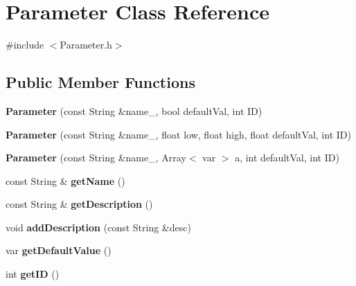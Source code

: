 \hypertarget{classParameter}{\section{Parameter Class Reference}
\label{classParameter}
}


{\ttfamily \#include $<$Parameter.\-h$>$}

\subsection*{Public Member Functions}
\begin{DoxyCompactItemize}
\item 
\hypertarget{classParameter_a21c5d8266e270b1f23295eabbe35d37f}{{\bfseries Parameter} (const String \&name\-\_\-, bool default\-Val, int I\-D)}\label{classParameter_a21c5d8266e270b1f23295eabbe35d37f}

\item 
\hypertarget{classParameter_a2ee8423ed28378b77eff4e69ebe31be1}{{\bfseries Parameter} (const String \&name\-\_\-, float low, float high, float default\-Val, int I\-D)}\label{classParameter_a2ee8423ed28378b77eff4e69ebe31be1}

\item 
\hypertarget{classParameter_a481767bd518c8c75459dc16580b19199}{{\bfseries Parameter} (const String \&name\-\_\-, Array$<$ var $>$ a, int default\-Val, int I\-D)}\label{classParameter_a481767bd518c8c75459dc16580b19199}

\item 
\hypertarget{classParameter_a40dd77acd828bd3f50832548ec3b8cfd}{const String \& {\bfseries get\-Name} ()}\label{classParameter_a40dd77acd828bd3f50832548ec3b8cfd}

\item 
\hypertarget{classParameter_ad2a916413e8cf95f677a5f2e12ddb919}{const String \& {\bfseries get\-Description} ()}\label{classParameter_ad2a916413e8cf95f677a5f2e12ddb919}

\item 
\hypertarget{classParameter_a2e5de29da44e4d0f04a236c862cce2dc}{void {\bfseries add\-Description} (const String \&desc)}\label{classParameter_a2e5de29da44e4d0f04a236c862cce2dc}

\item 
\hypertarget{classParameter_a6ce1f8114743d115e7d697d186a07f3b}{var {\bfseries get\-Default\-Value} ()}\label{classParameter_a6ce1f8114743d115e7d697d186a07f3b}

\item 
\hypertarget{classParameter_ac26fceaf830c0a9d8378fcb1266a6895}{int {\bfseries get\-I\-D} ()}\label{classParameter_ac26fceaf830c0a9d8378fcb1266a6895}


\end{DoxyCompactItemize}
